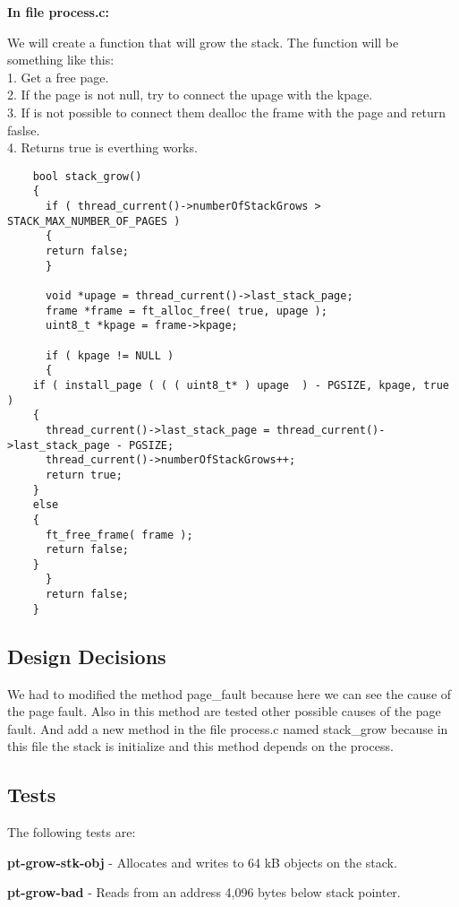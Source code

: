 \textbf{In file process.c: }

We will create a function that will grow the stack. The function will be something like this:
      \\1. Get a free page. 
      \\2. If the page is not null, try to connect the  upage with the kpage.
      \\3. If is not possible to connect them dealloc the frame with the page and return faslse.
      \\4. Returns true is everthing works.

\begin{lstlisting}
    bool stack_grow()
    {
      if ( thread_current()->numberOfStackGrows > STACK_MAX_NUMBER_OF_PAGES )
      {
	  return false;
      }

      void *upage = thread_current()->last_stack_page;
      frame *frame = ft_alloc_free( true, upage );
      uint8_t *kpage = frame->kpage;
 
      if ( kpage != NULL )
      {
	if ( install_page ( ( ( uint8_t* ) upage  ) - PGSIZE, kpage, true )
	{
	  thread_current()->last_stack_page = thread_current()->last_stack_page - PGSIZE;
	  thread_current()->numberOfStackGrows++;
	  return true;
	}
	else
	{
	  ft_free_frame( frame );
	  return false;
	}
      }
      return false;
    }

\end{lstlisting}


\subsection{Design Decisions}

We had to modified the method page\_fault because here we can see the cause of the page fault. Also in this method are tested other possible causes of the page fault. And add a new method in the file process.c named stack\_grow because in this file the stack is initialize and this method depends on the process.


\subsection{Tests}

The following tests are: 

\textbf{pt-grow-stk-obj} - Allocates and writes to 64 kB objects on the stack. 

\textbf{pt-grow-bad} - Reads from an address 4,096 bytes below stack pointer. 

